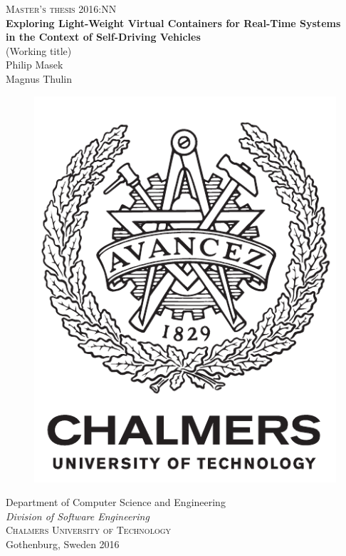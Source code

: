  
\newpage
\thispagestyle{empty}
\begin{center}
	\textsc{\large Master's thesis 2016:NN}\\[4cm]		%
	\textbf{\Large 	Exploring Light-Weight Virtual Containers for Real-Time Systems \\[0cm]
					in the Context of Self-Driving Vehicles} \\[1cm]
	{\large (Working title)}\\[1cm]
	{\Large Philip Masek}\\[0.4cm]
	{\Large Magnus Thulin}
	
	\vfill	
	\begin{figure}[H]
	\centering
	\includegraphics[width=0.2\pdfpagewidth]{figure/auxiliary/logo_eng.pdf} \\	
	\end{figure}	\vspace{5mm}	
	
	Department of Computer Science and Engineering \\
	\emph{Division of Software Engineering}\\
	\textsc{Chalmers University of Technology} \\
	Gothenburg, Sweden 2016 \\
\end{center}


